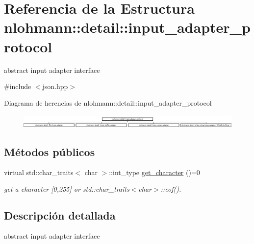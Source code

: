 \hypertarget{structnlohmann_1_1detail_1_1input__adapter__protocol}{}\section{Referencia de la Estructura nlohmann\+:\+:detail\+:\+:input\+\_\+adapter\+\_\+protocol}
\label{structnlohmann_1_1detail_1_1input__adapter__protocol}


abstract input adapter interface  




{\ttfamily \#include $<$json.\+hpp$>$}

Diagrama de herencias de nlohmann\+:\+:detail\+:\+:input\+\_\+adapter\+\_\+protocol\begin{figure}[H]
\begin{center}
\leavevmode
\includegraphics[height=0.742706cm]{structnlohmann_1_1detail_1_1input__adapter__protocol}
\end{center}
\end{figure}
\subsection*{Métodos públicos}
\begin{DoxyCompactItemize}
\item 
\mbox{\label{structnlohmann_1_1detail_1_1input__adapter__protocol_aac10a6a4048a8ce8e2ed50277692a3ca}} 
virtual std\+::char\+\_\+traits$<$ char $>$\+::int\+\_\+type \mbox{\hyperlink{structnlohmann_1_1detail_1_1input__adapter__protocol_aac10a6a4048a8ce8e2ed50277692a3ca}{get\+\_\+character}} ()=0
\begin{DoxyCompactList}\small\item\em get a character \mbox{[}0,255\mbox{]} or std\+::char\+\_\+traits$<$char$>$\+::eof(). \end{DoxyCompactList}\end{DoxyCompactItemize}


\subsection{Descripción detallada}
abstract input adapter interface 

